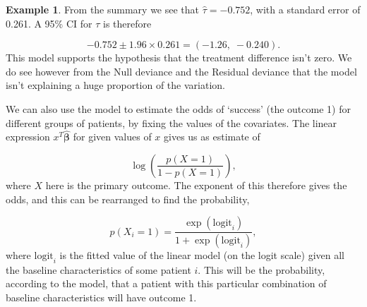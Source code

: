 \documentclass[
  openany]{book}
\theoremstyle{definition}
\theoremstyle{definition}
\newtheorem{example}{Example}[chapter]
\theoremstyle{definition}
\theoremstyle{definition}
\theoremstyle{remark}
\begin{document}
\begin{example}
From the summary we see that \(\hat\tau = -0.752\), with a standard error of 0.261. A 95\% CI for \(\tau\) is therefore

\[-0.752 \pm 1.96\times 0.261 = \left(-1.26,\;-0.240\right).\]
This model supports the hypothesis that the treatment difference isn't zero. We do see however from the Null deviance and the Residual deviance that the model isn't explaining a huge proportion of the variation.
\end{example}

We can also use the model to estimate the odds of `success' (the outcome 1) for different groups of patients, by fixing the values of the covariates. The linear expression \(x^T\hat{\boldsymbol\beta}\) for given values of \(x\) gives us as estimate of

\[\log\left(\frac{p(X=1)}{1-p(X=1)}\right),\]
where \(X\) here is the primary outcome. The exponent of this therefore gives the odds, and this can be rearranged to find the probability,

\[p\left(X_i=1\right) = \frac{\exp(\text{logit}_i)}{1+\exp(\text{logit}_i)}, \]
where \(\text{logit}_i\) is the fitted value of the linear model (on the logit scale) given all the baseline characteristics of some patient \(i\).
This will be the probability, according to the model, that a patient with this particular combination of baseline characteristics will have outcome 1.
\end{document}

